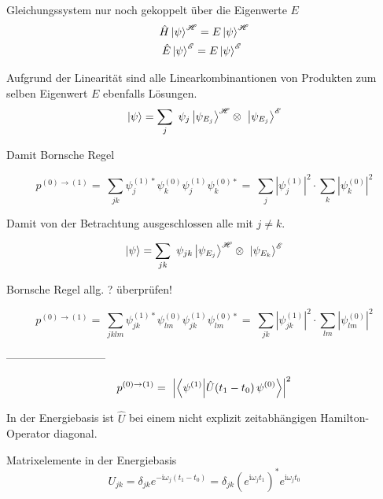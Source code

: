 \documentclass[12pt]{article}
\begin{document}
Gleichungssystem nur noch gekoppelt über die Eigenwerte $E$
\begin{equation}
\begin{split}
\hat{H}\ket{\psi}^{\mathscr{H}} = E\ket{\psi}^{\mathscr{H}}\\
\hat{E}\ket{\psi}^{\mathscr{E}} = E\ket{\psi}^{\mathscr{E}}\ \ 
\end{split}
\end{equation}

Aufgrund der Linearität sind alle Linearkombinantionen von Produkten zum selben Eigenwert $E$ ebenfalls Lösungen.
\begin{equation}
\ket{\psi} = \sum_j\ \psi_j \ket{\psi_{E_j}}^{\mathscr{H}} \otimes\ \ket{\psi_{E_j}}^{\mathscr{E}}
\end{equation}


Damit Bornsche Regel

\begin{equation} 
p^{(0)\rightarrow(1)} =\ \sum_{jk} \psi_j^{(1)*}\psi_k^{(0)}\psi_j^{(1)}\psi_k^{(0)*}
=\  \sum_{j} |\psi_j^{(1)}|^2 \cdot \sum_{k} |\psi_k^{(0)}|^2
\end{equation}

Damit von der Betrachtung ausgeschlossen alle mit $j \neq k$.

\begin{equation}
\ket{\psi} = \sum_{jk}\ \psi_{jk} \ket{\psi_{E_j}}^{\mathscr{H}} \otimes\ \ket{\psi_{E_k}}^{\mathscr{E}}
\end{equation}

Bornsche Regel allg. ? überprüfen!

\begin{equation} 
p^{(0)\rightarrow(1)} =\ \sum_{jklm} \psi_{jk}^{(1)*}\psi_{lm}^{(0)}\psi_{jk}^{(1)}\psi_{lm}^{(0)*}
=\  \sum_{jk} |\psi_{jk}^{(1)}|^2 \cdot \sum_{lm} |\psi_{lm}^{(0)}|^2
\end{equation}


---------------------------

\begin{equation} 
\label{eq:conditional_probability}
p^{(0)\rightarrow(1)} =\ \Bigl| \bra{\psi^{(1)}}\ket{\hat{U}(t_1-t_0)\,\psi^{(0)}} \Bigr|^2
\end{equation}

In der Energiebasis ist $\hat{U}$ bei einem nicht explizit zeitabhängigen Hamilton-Operator diagonal.

Matrixelemente in der Energiebasis
\begin{equation} 
U_{jk} = \delta_{jk} e^{-\mathrm{i}\omega_j(t_1-t_0)}
= 
\delta_{jk}(e^{\mathrm{i}\omega_j t_1})^* e^{\mathrm{i}\omega_j t_0}
\end{equation}
\end{document}
